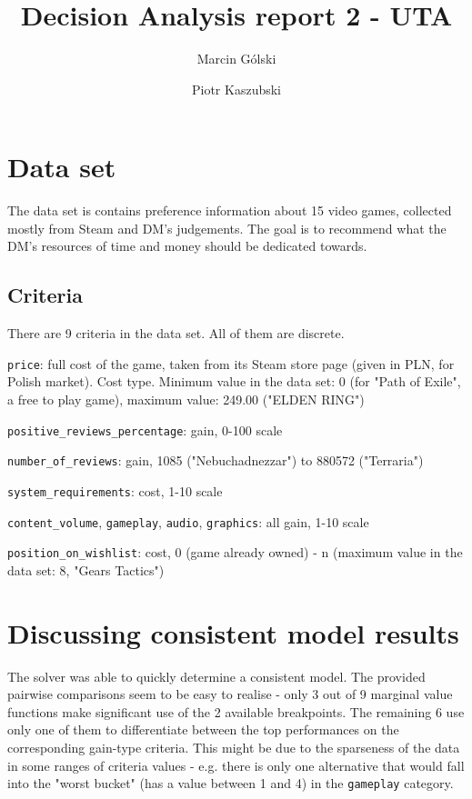 \documentclass{article}
\author{Marcin Gólski \and Piotr Kaszubski}
\title{Decision Analysis report 2 - UTA}
\begin{document}
\maketitle


\section{Data set}
The data set is contains preference information about 15 video games, collected mostly from Steam  and DM's judgements. The goal is to recommend what the DM's resources of time and money should be dedicated towards.

\subsection{Criteria}
    There are 9 criteria in the data set. All of them are discrete.

    \verb|price|: full cost of the game, taken from its Steam store page (given in PLN, for Polish market). Cost type. Minimum value in the data set: 0 (for "Path of Exile", a free to play game), maximum value: 249.00 ("ELDEN RING")

    \verb|positive_reviews_percentage|: gain, 0-100 scale

    \verb|number_of_reviews|: gain, 1085 ("Nebuchadnezzar") to 880572 ("Terraria")

    \verb|system_requirements|: cost, 1-10 scale

    \verb|content_volume|, \verb|gameplay|, \verb|audio|, \verb|graphics|: all gain, 1-10 scale

    \verb|position_on_wishlist|: cost, 0 (game already owned) - n (maximum value in the data set: 8, "Gears Tactics")

\section{Discussing consistent model results}

The solver was able to quickly determine a consistent model. The provided pairwise comparisons seem to be easy to realise -
only 3 out of 9 marginal value functions make significant use of the 2 available breakpoints. The remaining 6 use only one of them to differentiate between the top performances on the corresponding gain-type criteria. This might be due to the sparseness of the data in some ranges of criteria values - e.g. there is only one alternative that would fall into the "worst bucket" (has a value between 1 and 4) in the \verb|gameplay| category.
\end{document}
